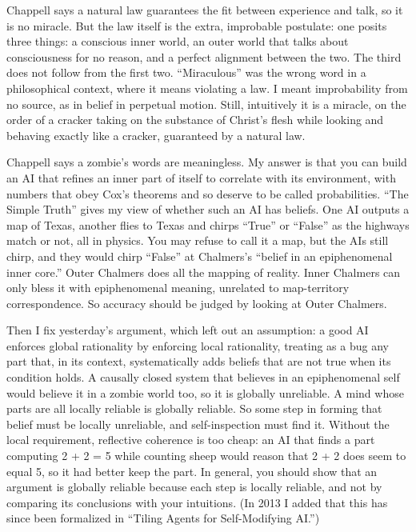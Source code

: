 Chappell says a natural law guarantees the fit between experience and talk, so it is no miracle. But the law itself is the extra, improbable postulate: one posits three things: a conscious inner world, an outer world that talks about consciousness for no reason, and a perfect alignment between the two. The third does not follow from the first two. ``Miraculous'' was the wrong word in a philosophical context, where it means violating a law. I meant improbability from no source, as in belief in perpetual motion. Still, intuitively it is a miracle, on the order of a cracker taking on the substance of Christ's flesh while looking and behaving exactly like a cracker, guaranteed by a natural law. 

Chappell says a zombie's words are meaningless. My answer is that you can build an AI that refines an inner part of itself to correlate with its environment, with numbers that obey Cox's theorems and so deserve to be called probabilities. ``The Simple Truth'' gives my view of whether such an AI has beliefs. One AI outputs a map of Texas, another flies to Texas and chirps ``True'' or ``False'' as the highways match or not, all in physics. You may refuse to call it a map, but the AIs still chirp, and they would chirp ``False'' at Chalmers's ``belief in an epiphenomenal inner core.'' Outer Chalmers does all the mapping of reality. Inner Chalmers can only bless it with epiphenomenal meaning, unrelated to map-territory correspondence. So accuracy should be judged by looking at Outer Chalmers. 

Then I fix yesterday's argument, which left out an assumption: a good AI enforces global rationality by enforcing local rationality, treating as a bug any part that, in its context, systematically adds beliefs that are not true when its condition holds. A causally closed system that believes in an epiphenomenal self would believe it in a zombie world too, so it is globally unreliable. A mind whose parts are all locally reliable is globally reliable. So some step in forming that belief must be locally unreliable, and self-inspection must find it. Without the local requirement, reflective coherence is too cheap: an AI that finds a part computing 2 + 2 = 5 while counting sheep would reason that 2 + 2 does seem to equal 5, so it had better keep the part. In general, you should show that an argument is globally reliable because each step is locally reliable, and not by comparing its conclusions with your intuitions. (In 2013 I added that this has since been formalized in ``Tiling Agents for Self-Modifying AI.'')

